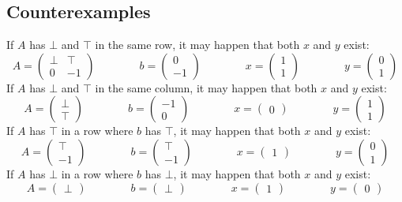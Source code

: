 \documentclass[]{article}
\renewcommand{\.}{\hskip .75pt}
\begin{document}
\subsection{Counterexamples}

If $A$ has $\bot$ and $\top$ in the same row, it may happen that both $x$ and $y$ exist:
$$
A =
\begin{pmatrix}
	\bot & \top \\
	0 & -1
\end{pmatrix}
\qquad \qquad
b = \begin{pmatrix} 0 \\ -1 \end{pmatrix}
\qquad \qquad
x = \begin{pmatrix} 1 \\ 1 \end{pmatrix}
\qquad \qquad
y = \begin{pmatrix} 0 \\ 1 \end{pmatrix}
$$
If $A$ has $\bot$ and $\top$ in the same column, it may happen that both $x$ and $y$ exist:
$$
A = \begin{pmatrix} \bot \\ \top \end{pmatrix}
\qquad \qquad
b = \begin{pmatrix} -1 \\ 0 \end{pmatrix}
\qquad \qquad
x = \begin{pmatrix} 0 \end{pmatrix}
\qquad \qquad
y = \begin{pmatrix} 1 \\ 1 \end{pmatrix}
$$
If $A$ has $\top$ in a row where $b$ has $\top$, it may happen that both $x$ and $y$ exist:
$$
A = \begin{pmatrix} \top \\ -1 \end{pmatrix}
\qquad \qquad
b = \begin{pmatrix} \top \\ -1 \end{pmatrix}
\qquad \qquad
x = \begin{pmatrix} 1 \end{pmatrix}
\qquad \qquad
y = \begin{pmatrix} 0 \\ 1 \end{pmatrix}
$$
If $A$ has $\bot$ in a row where $b$ has $\bot$, it may happen that both $x$ and $y$ exist:
$$
A = \begin{pmatrix} \bot \end{pmatrix}
\qquad \qquad
b = \begin{pmatrix} \bot \end{pmatrix}
\qquad \qquad
x = \begin{pmatrix} 1 \end{pmatrix}
\qquad \qquad
y = \begin{pmatrix} 0 \end{pmatrix}
$$
\end{document}
